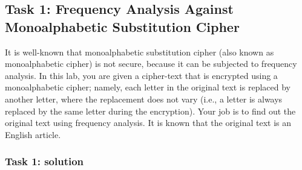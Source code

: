 \documentclass[12pt]{article}
\begin{document}
\subsection{Task 1: Frequency Analysis Against Monoalphabetic Substitution Cipher}
    
It is well-known that monoalphabetic substitution cipher (also known as monoalphabetic cipher) is not secure, because it can be subjected to frequency analysis. In this lab, you are given a cipher-text that is encrypted using a monoalphabetic cipher; namely, each letter in the original text is replaced by another letter, where the replacement does not vary (i.e., a letter is always replaced by the same letter during the encryption). Your job is to find out the original text using frequency analysis. It is known that the original text is an English article.

\subsubsection{Task 1: solution}
\end{document}

